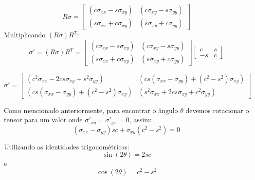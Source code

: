 \documentclass[
12pt,
a4paper,
oneside,
chapter=TITLE,
sumario=tradicional
]{abntex2}
\begin{document}
\begin{equation*}
	R\sigma=  
	\begin{bmatrix}
		(c\sigma_{xx}-s\sigma_{xy})  
		&  
		(c\sigma_{xy}-s\sigma_{yy}  )
		\\  
		(s\sigma_{xx}+c\sigma_{xy})  
		&  
		(s\sigma_{xy}+c\sigma_{yy})  
	\end{bmatrix}  
\end{equation*}
Multiplicando $(R\sigma)R^T$:
\begin{equation*}
	\sigma'= (R\sigma)R^T = 
\begin{bmatrix}
	(c\sigma_{xx}-s\sigma_{xy})  
	&  
	(c\sigma_{xy}-s\sigma_{yy}  )
	\\  
	(s\sigma_{xx}+c\sigma_{xy})  
	&  
	(s\sigma_{xy}+c\sigma_{yy})  
\end{bmatrix}
	\begin{bmatrix}  
	c & s \\  
	-s & c  
\end{bmatrix}   
\end{equation*}





\begin{equation} %
	\sigma' =
	\begin{bmatrix}  
		(c^2\sigma_{xx}-2cs\sigma_{xy}+s^2\sigma_{yy})   
		&  
		(cs(\sigma_{xx}-\sigma_{yy})+(c^2-s^2)\sigma_{xy})  
		\\  
		(cs(\sigma_{xx}-\sigma_{yy}) + (c^2-s^2)\sigma_{xy} )
		&  
		(s^2\sigma_{xx} + 2cs\sigma_{xy} + c^2\sigma_{yy}  )
	\end{bmatrix}
	\label{eq:SigmaLinha_002} 
\end{equation}

Como mencionado anteriormente, para encontrar o ângulo $\theta$ devemos rotacionar o tensor para um valor onde  $\sigma'_{xy} = \sigma'_{yx} = 0$, assim:
\begin{equation} %
(\sigma_{xx}-\sigma_{yy})sc + \sigma_{xy}(c^2-s^2) = 0  
	\label{eq:SigmaLinha_003} 
\end{equation}

Utilizando as identidades trigonométricas:
\begin{equation} %
\sin(2\theta)=2sc  
	\label{eq:identTrigono_001} 
\end{equation}
e
\begin{equation} %
\cos(2\theta)=c^2-s^2  
	\label{eq:identTrigono_002} 
\end{equation}
\end{document}

